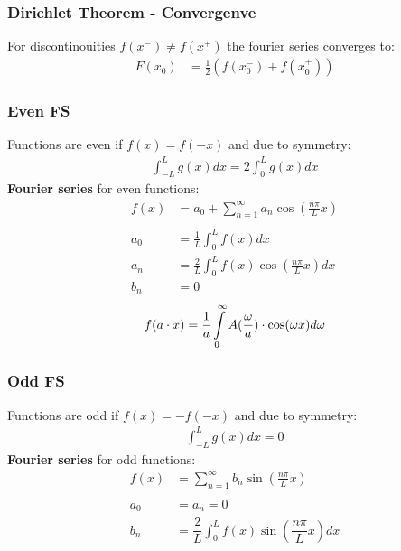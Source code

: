 \subsubsection{Dirichlet Theorem - Convergenve}
For discontinouities $f(x^-)\neq f(x^+)$ the fourier series converges to:
\begin{align*}
    F(x_0) & =\frac12(f(x_0^-)+f(x_0^+))
\end{align*}

\subsubsection{Even FS}
Functions are even if $f(x)=f(-x)$ and due to symmetry:
\begin{align*}
    \int_{-L}^{L}g(x)dx=2\int_0^{L}g(x)dx
\end{align*}
\textbf{Fourier series} for even functions:
\begin{align*}
    f(x)  & =a_0+\sum_{n=1}^{\infty}a_n\cos\left(\frac{n\pi}{L}x\right) \\ \\
    a_{0} & =\frac{1}{L}\int_{0}^{L}f(x)dx                              \\
    a_{n} & =\frac2L\int_0^{L}f(x)\cos\left(\frac{n\pi}Lx\right)dx        \\
    b_{n} & =0
\end{align*}
\begin{align*}
    f(a\cdot x)=\frac1a\intop_0^\infty A(\frac\omega a)\cdot \cos(\omega x)d\omega
\end{align*}
\subsubsection{Odd FS}
Functions are odd if $f(x)=-f(-x)$ and due to symmetry:
\begin{align*}
    \int_{-L}^L g(x)dx=0
\end{align*}
\textbf{Fourier series} for odd functions:
\begin{align*}
    f(x) & =\sum_{n=1}^\infty b_n\sin\left(\frac{n\pi}Lx\right)         \\ \\
    a_0  & = a_n = 0                                                    \\
    b_n  & =\dfrac{2}{L}\int_0^L f(x)\sin\left(\dfrac{n\pi}{L}x\right)dx
\end{align*}

